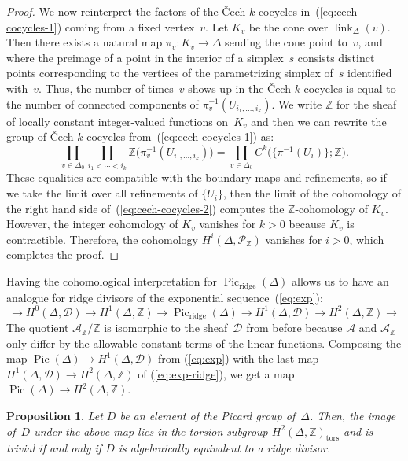 \documentclass[11pt]{amsart}
\newtheorem{prop}[thm]{Proposition}
\theoremstyle{definition}
\newcommand{\cA}{\mathcal A}
\newcommand{\cD}{\mathcal D}
\newcommand{\cP}{\mathcal P}
\newcommand{\link}{\operatorname{link}}
\newcommand{\Pic}{\operatorname{Pic}}
\newcommand{\ridge}{\operatorname{ridge}}
\newcommand{\tors}{\mathrm{tors}}
\newcommand{\ZZ}{\mathbb Z}
\begin{document}
\begin{proof}
We now reinterpret the factors of the \v Cech $k$-cocycles
in~(\ref{eq:cech-cocycles-1}) coming from a fixed
vertex~$v$. Let $K_v$ be the cone over $\link_\Delta(v)$. Then there exists a
natural map $\pi_v \colon K_v \rightarrow \Delta$ sending the cone point to~$v$,
and where the preimage of a point in the
interior of a simplex~$s$ consists distinct points
corresponding to the vertices of the parametrizing simplex of~$s$ identified
with~$v$. Thus, the number of times~$v$ shows up in the \v Cech $k$-cocycles is
equal to the number of connected components of $\pi_v^{-1}(U_{i_1, \ldots,
i_k})$. We write $\ZZ$ for the sheaf of locally constant integer-valued
functions on~$K_v$ and then we can rewrite the group of \v Cech $k$-cocycles
from~(\ref{eq:cech-cocycles-1}) as:
\begin{equation}\label{eq:cech-cocycles-2}
\prod_{v \in \Delta_0}  \prod_{i_1 < \cdots < i_k}
\ZZ\big(\pi_v^{-1}( U_{i_1, \ldots, i_k})\big) = \prod_{v \in \Delta_0}
C^k\big(\{\pi^{-1}(U_i)\}; \ZZ\big).
\end{equation}
These equalities are compatible with the boundary maps and refinements, so
if we take the limit over all refinements of $\{U_i\}$, then the limit of the
cohomology of the right hand side of~(\ref{eq:cech-cocycles-2}) computes the
$\ZZ$-cohomology of $K_v$. However, the integer cohomology of $K_v$ vanishes
for $k > 0$ because $K_v$ is contractible. Therefore, the cohomology
$H^i(\Delta, \cP_{\ZZ})$ vanishes for $i > 0$, which completes the proof.
\end{proof}

Having the cohomological interpretation for $\Pic_{\ridge}(\Delta)$ allows us
to have an analogue for ridge divisors of the exponential
sequence~(\ref{eq:exp}):
\begin{equation}\label{eq:exp-ridge}
\rightarrow
H^0(\Delta, \cD) \rightarrow H^1(\Delta, \ZZ) \rightarrow
\Pic_{\ridge}(\Delta) \rightarrow
H^1(\Delta, \cD) \rightarrow H^2(\Delta, \ZZ) \rightarrow
\end{equation}
The quotient $\cA_\ZZ / \ZZ$ is isomorphic to the
sheaf~$\cD$ from before because $\cA$ and $\cA_{\ZZ}$ only differ by the
allowable constant terms of the linear functions.
Composing the map
$\Pic(\Delta) \rightarrow H^1(\Delta, \cD)$ from (\ref{eq:exp}) with the last
map $H^1(\Delta, \cD) \rightarrow H^2(\Delta, \ZZ)$ of (\ref{eq:exp-ridge}), we
get a map $\Pic(\Delta) \rightarrow H^2(\Delta, \ZZ)$.

\begin{prop}\label{prop:ridge-obstruction}
Let $D$ be an element of the Picard group of~$\Delta$. Then, the
image of~$D$ under the above map lies in the torsion subgroup $H^2(\Delta,
\ZZ)_{\tors}$ and is trivial if and only if $D$ is algebraically equivalent to a
ridge divisor.
\end{prop}
\end{document}
